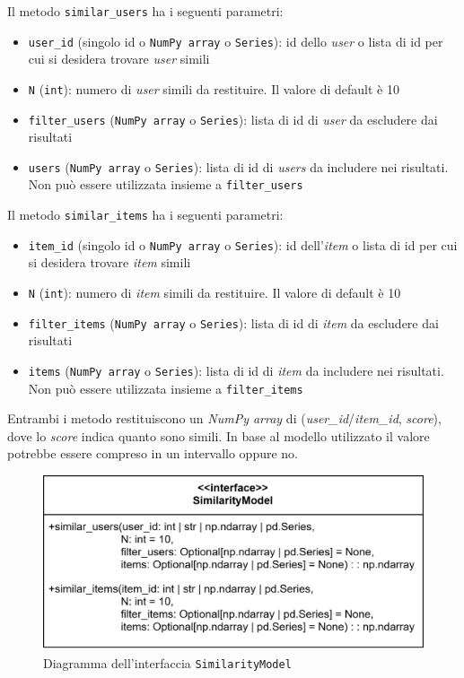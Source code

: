 Il metodo \texttt{similar\_users} ha i seguenti parametri:

\begin{itemize}
    \item \texttt{user\_id} (singolo id o \texttt{NumPy array} o \texttt{Series}): id dello \textit{user} o lista di id per cui si desidera trovare \textit{user} simili
    \item \texttt{N} (\texttt{int}): numero di \textit{user} simili da restituire. Il valore di default è 10
    \item \texttt{filter\_users} (\texttt{NumPy array} o \texttt{Series}): lista di id di \textit{user} da escludere dai risultati
    \item \texttt{users} (\texttt{NumPy array} o \texttt{Series}): lista di id di \textit{users} da includere nei risultati. Non può essere utilizzata insieme a \texttt{filter\_users}
\end{itemize}

Il metodo \texttt{similar\_items} ha i seguenti parametri:
\begin{itemize}
    \item \texttt{item\_id} (singolo id o \texttt{NumPy array} o \texttt{Series}): id dell'\textit{item} o lista di id per cui si desidera trovare \textit{item} simili
    \item \texttt{N} (\texttt{int}): numero di \textit{item} simili da restituire. Il valore di default è 10
    \item \texttt{filter\_items} (\texttt{NumPy array} o \texttt{Series}): lista di id di \textit{item} da escludere dai risultati
    \item \texttt{items} (\texttt{NumPy array} o \texttt{Series}): lista di id di \textit{item} da includere nei risultati. Non può essere utilizzata insieme a \texttt{filter\_items}
\end{itemize}

Entrambi i metodo restituiscono un \textit{NumPy array} di (\textit{user\_id}/\textit{item\_id}, \textit{score}), dove lo \textit{score} indica quanto sono simili. In base al modello utilizzato il valore potrebbe essere compreso in un intervallo oppure no.

\begin{figure}[H]
    \centering
    \includegraphics[scale=0.25]{figures/UML/models/similarity_model.png}
    \caption{Diagramma dell'interfaccia \texttt{SimilarityModel}}
\end{figure}


